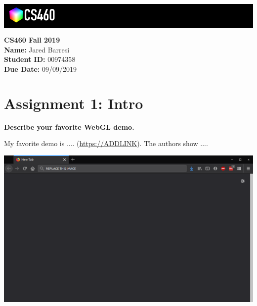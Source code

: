 \documentclass[10pt,oneside,onecolumn,letterpaper]{article}
\begin{document}
\noindent\colorbox{black}{
\begin{minipage}[c]{.99\linewidth}
  \vspace{.4cm}
  \Large{}
  \begin{flushright}
      \vspace{-1.2cm}
      \includegraphics[width=3cm]{gfx/cs460.png}
    \end{flushright}
  \end{minipage}
  }


  \vspace{.5cm} %

  \noindent\textbf{CS460 Fall 2019} \\
  \textbf{Name:} Jared Barresi \\
  \textbf{Student ID:} 00974358 \\
  \textbf{Due Date:} 09/09/2019

  \section*{Assignment 1: Intro}

  \textbf{Describe your favorite WebGL demo.}

  \vspace{.5cm} %

  \noindent My favorite demo is .... (\url{https://ADDLINK}). The authors show ....

  \vspace{.5cm} %

  \noindent\includegraphics[width=\textwidth]{gfx/empty_browser.png}
\end{document}
